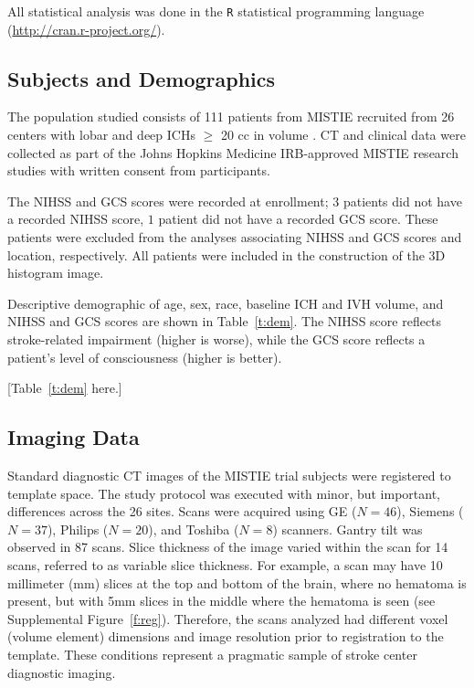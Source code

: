 \documentclass[10pt]{article}\usepackage[]{graphicx}\usepackage[]{color}
\begin{document}
All statistical analysis was done in the \verb|R| statistical programming language (\url{http://cran.r-project.org/}).  


\subsection{Subjects and Demographics}
The population studied consists of 111 patients from MISTIE recruited from 26 centers with lobar and deep ICHs $\geq$ 20 cc in volume \citep{mould_minimally_2013}. CT and clinical data were collected as part of the Johns Hopkins Medicine IRB-approved MISTIE research studies with written consent from participants.  

%
                 
The NIHSS and GCS scores were recorded at enrollment; $3$ patients did not have a recorded NIHSS score, $1$ patient did not have a recorded GCS score.  These patients were excluded from the analyses associating NIHSS and GCS scores and location, respectively.  All patients were included in the construction of the 3D histogram image.  

Descriptive demographic of age, sex, race, baseline ICH and IVH volume, and NIHSS and GCS scores are shown in Table~\ref{t:dem}. The NIHSS score reflects stroke-related impairment (higher is worse), while the GCS score reflects a patient's level of consciousness (higher is better).  

[Table~\ref{t:dem} here.]


\subsection{Imaging Data}
Standard diagnostic CT images of the MISTIE trial subjects were registered to template space. The study protocol was executed with minor, but important, differences across the 26 sites.  Scans were acquired using GE ($N=46$), Siemens ($N=37$), Philips ($N=20$), and Toshiba ($N=8$) scanners. Gantry tilt was observed in 87 scans.  Slice thickness of the image varied within the scan for 14 scans, referred to as variable slice thickness. For example, a scan may have 10 millimeter (mm) slices at the top and bottom of the brain, where no hematoma is present, but with 5mm slices in the middle where the hematoma is seen (see Supplemental Figure~\ref{f:reg}\protect{}).  Therefore, the scans analyzed had different voxel (volume element) dimensions and image resolution prior to registration to the template.  These conditions represent a pragmatic sample of stroke center diagnostic imaging.
\end{document}
